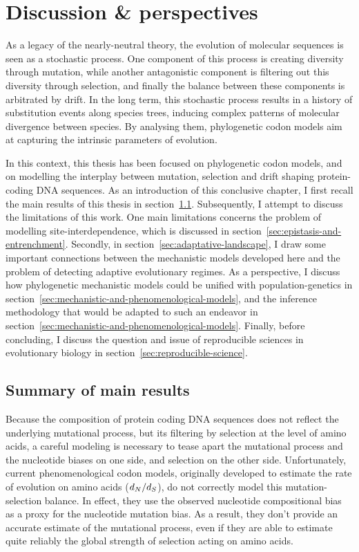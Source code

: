 \chapter{Discussion \& perspectives}
\label{ch:discussion-perspectives}
{\hypersetup{linkcolor=GREYDARK}\minitoc}

As a legacy of the nearly-neutral theory, the evolution of molecular sequences is seen as a stochastic process.
One component of this process is creating diversity through mutation, while another antagonistic component is filtering out this diversity through selection, and finally the balance between these components is arbitrated by drift.
In the long term, this stochastic process results in a history of substitution events along species trees, inducing complex patterns of molecular divergence between species.
By analysing them, phylogenetic codon models aim at capturing the intrinsic parameters of evolution.

In this context, this thesis has been focused on phylogenetic codon models, and on modelling the interplay between mutation, selection and drift shaping protein-coding DNA sequences.
As an introduction of this conclusive chapter, I first recall the main results of this thesis in section~\ref{sec:summary-of-main-results}.
Subsequently, I attempt to discuss the limitations of this work.
One main limitations concerns the problem of modelling site-interdependence, which is discussed in section~\ref{sec:epistasis-and-entrenchment}.
Secondly, in section~\ref{sec:adaptative-landscape}, I draw some important connections between the mechanistic models developed here and the problem of detecting adaptive evolutionary regimes.
As a perspective, I discuss how phylogenetic mechanistic models could be unified with population-genetics in section~\ref{sec:mechanistic-and-phenomenological-models}, and the inference methodology that would be adapted to such an endeavor in section~\ref{sec:mechanistic-and-phenomenological-models}.
Finally, before concluding, I discuss the question and issue of reproducible sciences in evolutionary biology in section~\ref{sec:reproducible-science}.


\section{Summary of main results}
\label{sec:summary-of-main-results}

Because the composition of protein coding DNA sequences does not reflect the underlying mutational process, but its filtering by selection at the level of amino acids, a careful modeling is necessary to tease apart the mutational process and the nucleotide biases on one side, and selection on the other side.
Unfortunately, current phenomenological codon models, originally developed to estimate the rate of evolution on amino acids ($d_N / d_S$), do not correctly model this mutation-selection balance.
In effect, they use the observed nucleotide compositional bias as a proxy for the nucleotide mutation bias.
As a result, they don’t provide an accurate estimate of the mutational process, even if they are able to estimate quite reliably the global strength of selection acting on amino acids.

